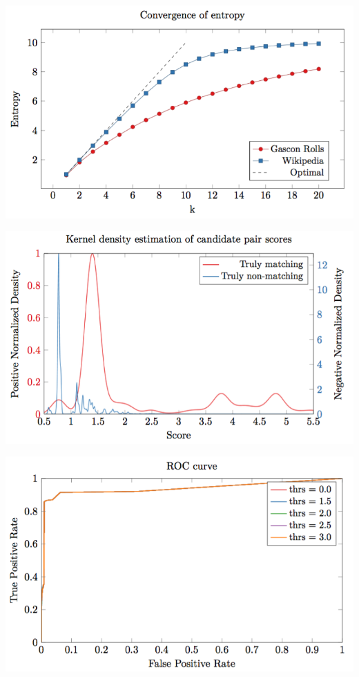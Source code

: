 \documentclass[12pt]{beamer}
\theoremstyle{break}
\begin{document}


\begin{frame}
	\centering
	\includegraphics[width=\textwidth]{images/pic2}

\end{frame}




\begin{frame}
	\centering
	\includegraphics[width=\textwidth]{images/pic3}

\end{frame}




\begin{frame}
	\centering
	\includegraphics[width=\textwidth]{images/pic4}

\end{frame}
\end{document}
